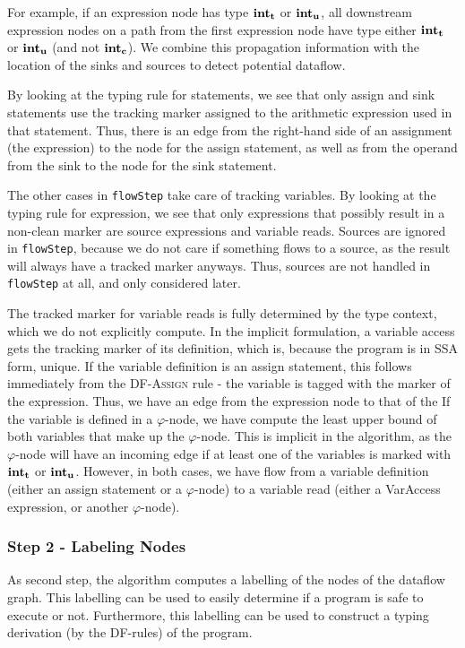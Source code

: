 For example, if an expression node has type $\textbf{int}_\textbf{t}$ or $\textbf{int}_\textbf{u}$,
all downstream expression nodes on a path from the first expression node 
have type either $\textbf{int}_\textbf{t}$ or $\textbf{int}_\textbf{u}$ (and not $\textbf{int}_\textbf{c}$).
We combine this propagation information with the location of the sinks and sources 
to detect potential dataflow.

By looking at the typing rule for statements, we see that only assign and sink statements
use the tracking marker assigned to the arithmetic expression used in that statement.
Thus, there is an edge from the right-hand side of an assignment (the expression) 
to the node for the assign statement, as well as from the operand from the sink 
to the node for the sink statement.

The other cases in \texttt{flowStep} take care of tracking variables.
By looking at the typing rule for expression, we see that only expressions that possibly 
result in a non-clean marker are source expressions and variable reads.
Sources are ignored in \texttt{flowStep}, because we do not care
if something flows to a source, as the result will always have a tracked marker anyways.
Thus, sources are not handled in \texttt{flowStep} at all, and only considered later.

The tracked marker for variable reads is fully determined by the type context,
which we do not explicitly compute.
In the implicit formulation, a variable access gets the tracking marker of its definition,
which is, because the program is in SSA form, unique.
If the variable definition is an assign statement, this follows immediately from the
\textsc{DF-Assign} rule - the variable is tagged with the marker of the expression.
Thus, we have an edge from the expression node to that of the 
If the variable is defined in a $\varphi$-node, we have compute the least upper bound of 
both variables that make up the $\varphi$-node.
This is implicit in the algorithm, as the $\varphi$-node will have an incoming edge if 
at least one of the variables is marked with $\textbf{int}_\textbf{t}$ or $\textbf{int}_\textbf{u}$.
However, in both cases, we have flow from a variable definition (either an assign
statement or a $\varphi$-node) to a variable read (either a VarAccess expression, 
or another $\varphi$-node).

\subsubsection*{Step 2 - Labeling Nodes}
As second step, the algorithm computes a labelling of the nodes of the dataflow graph.
This labelling can be used to easily determine if a program is safe to execute or not.
Furthermore, this labelling can be used to construct a typing derivation (by the DF-rules)
of the program.


